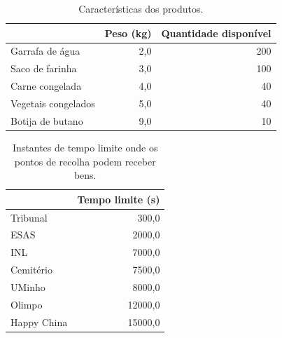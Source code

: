 \documentclass[12pt, a4paper, titlepage]{article}
\begin{document}
\begin{table}[H]
    \small

    \begin{adjustwidth}{-1.5cm}{-1.5cm}
        \begin{center}
            \begin{tabular}{|l|r|r|}
                \hline
                & Peso (kg)
                & Quantidade disponível \\

                \hline
                Garrafa de água & 2,0 & 200 \\
                \hline
                Saco de farinha & 3,0 & 100 \\
                \hline
                Carne congelada & 4,0 & 40 \\
                \hline
                Vegetais congelados & 5,0 & 40 \\
                \hline
                Botija de butano & 9,0 & 10 \\
                \hline
            \end{tabular}
        \end{center}
    \end{adjustwidth}

    \caption{Características dos produtos.}
\end{table}

\begin{table}[H]
    \small

    \begin{adjustwidth}{-1.5cm}{-1.5cm}
        \begin{center}
            \begin{tabular}{|l|r|}
                \hline
                & Tempo limite (s) \\

                \hline
                Tribunal & 300,0 \\
                \hline
                ESAS & 2000,0 \\
                \hline
                INL & 7000,0 \\
                \hline
                Cemitério & 7500,0 \\
                \hline
                UMinho & 8000,0 \\
                \hline
                Olimpo & 12000,0 \\
                \hline
                Happy China & 15000,0 \\
                \hline

            \end{tabular}
        \end{center}
    \end{adjustwidth}

    \caption{Instantes de tempo limite onde os pontos de recolha podem receber bens.}
\end{table}
\end{document}
